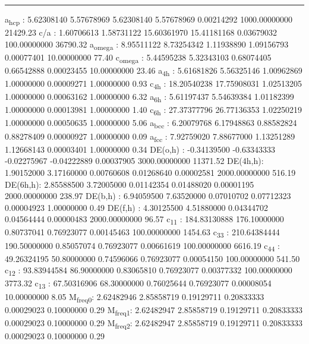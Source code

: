 \documentclass[11pt]{article}
\begin{document}
\noindent\rule{\textwidth}{0.5pt}
a\textsubscript{hcp}   :   5.62308140   5.57678969   5.62308140   5.57678969   0.00214292 1000.00000000     21429.23
c/a     :   1.60706613   1.58731122  15.60361970  15.41181168   0.03679032 100.00000000     36790.32
a\textsubscript{omega} :   8.95511122   8.73254342   1.11938890   1.09156793   0.00077401  10.00000000        77.40
c\textsubscript{omega} :   5.44595238   5.32343103   0.68074405   0.66542888   0.00023455  10.00000000        23.46
a\textsubscript{4h}    :   5.61681826   5.56325146   1.00962869   1.00000000   0.00009271   1.00000000         0.93
c\textsubscript{4h}    :  18.20540238  17.75908031   1.02513205   1.00000000   0.00063162   1.00000000         6.32
a\textsubscript{6h}    :   5.61197437   5.54639384   1.01182399   1.00000000   0.00013981   1.00000000         1.40
c\textsubscript{6h}    :  27.37377796  26.77136353   1.02250219   1.00000000   0.00050635   1.00000000         5.06
a\textsubscript{bcc}   :   6.20079768   6.17948863   0.88582824   0.88278409   0.00000927   1.00000000         0.09
a\textsubscript{fcc}   :   7.92759020   7.88677000   1.13251289   1.12668143   0.00003401   1.00000000         0.34
DE(o,h) :  -0.34139500  -0.63343333  -0.02275967  -0.04222889   0.00037905 3000.00000000     11371.52
DE(4h,h):   1.90152000   3.17160000   0.00760608   0.01268640   0.00002581 2000.00000000       516.19
DE(6h,h):   2.85588500   3.72005000   0.01142354   0.01488020   0.00001195 2000.00000000       238.97
DE(b,h) :   6.94059500   7.63520000   0.07010702   0.07712323   0.00004923   1.00000000         0.49
DE(f,h) :   4.30125500   4.51880000   0.04344702   0.04564444   0.00000483 2000.00000000        96.57
c\textsubscript{11}    : 184.83130888 176.10000000   0.80737041   0.76923077   0.00145463 100.00000000      1454.63
c\textsubscript{33}    : 210.64384444 190.50000000   0.85057074   0.76923077   0.00661619 100.00000000      6616.19
c\textsubscript{44}    :  49.26324195  50.80000000   0.74596066   0.76923077   0.00054150 100.00000000       541.50
c\textsubscript{12}    :  93.83944584  86.90000000   0.83065810   0.76923077   0.00377332 100.00000000      3773.32
c\textsubscript{13}    :  67.50316906  68.30000000   0.76025644   0.76923077   0.00008054  10.00000000         8.05
M\textsubscript{freq}\textsubscript{0}:   2.62482946   2.85858719   0.19129711   0.20833333   0.00029023   0.10000000         0.29
M\textsubscript{freq}\textsubscript{1}:   2.62482947   2.85858719   0.19129711   0.20833333   0.00029023   0.10000000         0.29
M\textsubscript{freq}\textsubscript{2}:   2.62482947   2.85858719   0.19129711   0.20833333   0.00029023   0.10000000         0.29
\end{document}
